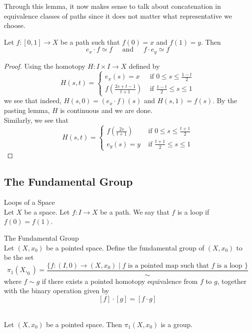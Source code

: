 \documentclass[a4paper]{article}
\begin{document}
Through this lemma, it now makes sense to talk about concatenation in equivalence classes of paths since it does not matter what representative we choose. 

\begin{prp}{}{} Let $f:[0,1]\to X$ be a path such that $f(0)=x$ and $f(1)=y$. Then $$e_x\cdot f\simeq f\;\;\;\;\text{ and }\;\;\;\;f\cdot e_y\simeq f$$ 
\begin{proof}
Using the homotopy $H:I\times I\to X$ defined by $$H(s,t)=\begin{cases}
e_x(s)=x & \text{ if } 0\leq s\leq\frac{1-t}{2}\\
f\left(\frac{2s+t-1}{t+1}\right) & \text{ if }\frac{1-t}{2}\leq s\leq 1
\end{cases}$$ we see that indeed, $H(s,0)=(e_x\cdot f)(s)$ and $H(s,1)=f(s)$. By the pasting lemma, $H$ is continuous and we are done. \\
Similarly, we see that $$H(s,t)=\begin{cases}
f\left(\frac{2s}{t+1}\right) & \text{ if } 0\leq s\leq\frac{t+1}{2}\\
e_y(s)=y & \text{ if } \frac{t+1}{2}\leq s\leq 1
\end{cases}$$
\end{proof}
\end{prp}

\subsection{The Fundamental Group}
\begin{defn}{Loops of a Space}{}\\
Let $X$ be a space. Let $f:I\to X$ be a path. We say that $f$ is a loop if $f(0)=f(1)$. 
\end{defn}

\begin{defn}{The Fundamental Group}{}\\
Let $(X,x_0)$ be a pointed space. Define the fundamental group of $(X,x_0)$ to be the set $$\pi_1(X,_0)=\frac{\{f:(I,0)\to(X,x_0)\;|\;f\text{ is a pointed map such that }f\text{ is a loop }\}}{\sim}$$ where $f\sim g$ if there exists a pointed homotopy equivalence from $f$ to $g$, together with the binary operation given by $$[f]\cdot[g]=[f\cdot g]$$
\end{defn}

\begin{lmm}{}{}\\
Let $(X,x_0)$ be a pointed space. Then $\pi_1(X,x_0)$ is a group. 
\end{lmm}
\end{document}
